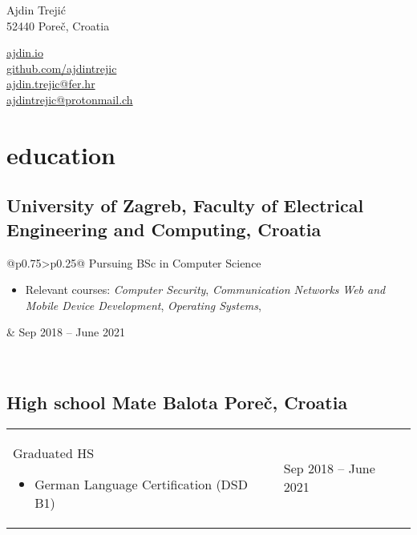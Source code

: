 \documentclass[a4paper]{article}
\makeatletter
\newlength{\tablewidth}
\newenvironment{period}[2]{%
\newcommand{\sarma}{#2}%
\setlength{\tablewidth}{\linewidth}
\addtolength{\tablewidth}{-2\tabcolsep}
\begin{tabular}{@{}p{0.75\tablewidth}>{\raggedleft\arraybackslash}p{0.25\tablewidth}@{}}%
#1 \newline
\begin{itemize}
}{%
\end{itemize} & \sarma \\%
\end{tabular}\\
}
\makeatother
\begin{document}
\fontfamily{\sfdefault}
\selectfont

\begin{minipage}{.5\textwidth}
\LARGE{Ajdin Trejić}\\
\normalsize{52440 Poreč, Croatia}
\end{minipage}%
\begin{minipage}{.5\textwidth}
\raggedleft
\href{https://ajdin.io}{ajdin.io} \\
\href{https://github.com/ajdintrejic}{github.com/ajdintrejic} \\
\href{mailto:ajdin.trejic@fer.hr}{ajdin.trejic@fer.hr} \\
\href{mailto:ajdintrejic@protonmail.ch}{ajdintrejic@protonmail.ch} 
\end{minipage}

\vspace{1em}

\section{education}

\subsection{University of Zagreb, Faculty of Electrical Engineering and Computing, Croatia}
\begin{period}{Pursuing BSc in Computer Science}{Sep 2018 -- June 2021\linebreak}
    \item Relevant courses:
        \textit{Computer Security},
        \textit{Communication Networks}
        \textit{Web and Mobile Device Development},
        \textit{Operating Systems},
\end{period}


\subsection{High school Mate Balota Poreč, Croatia}
\begin{period}{Graduated HS}{Sept 2014 -- May 2018}
\item German Language Certification (DSD B1)
\end{period}

\iffalse
\begin{period}{BSc in Computer Science}{Sep 2008 -- Jul 2011}
    \item thesis:
        \textit{GPU implementation of a space and time optimal parallel sequence alignment algorithm}
    \item completed optional course \textit{Competitive programming} (rank 3/40)
\end{period}
\fi
\end{document}
